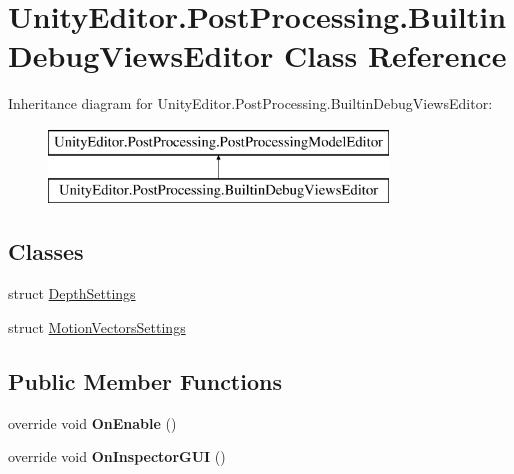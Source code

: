 \hypertarget{class_unity_editor_1_1_post_processing_1_1_builtin_debug_views_editor}{}\section{Unity\+Editor.\+Post\+Processing.\+Builtin\+Debug\+Views\+Editor Class Reference}
\label{class_unity_editor_1_1_post_processing_1_1_builtin_debug_views_editor}
Inheritance diagram for Unity\+Editor.\+Post\+Processing.\+Builtin\+Debug\+Views\+Editor\+:\begin{figure}[H]
\begin{center}
\leavevmode
\includegraphics[height=2.000000cm]{class_unity_editor_1_1_post_processing_1_1_builtin_debug_views_editor}
\end{center}
\end{figure}
\subsection*{Classes}
\begin{DoxyCompactItemize}
\item 
struct \hyperlink{struct_unity_editor_1_1_post_processing_1_1_builtin_debug_views_editor_1_1_depth_settings}{Depth\+Settings}
\item 
struct \hyperlink{struct_unity_editor_1_1_post_processing_1_1_builtin_debug_views_editor_1_1_motion_vectors_settings}{Motion\+Vectors\+Settings}
\end{DoxyCompactItemize}
\subsection*{Public Member Functions}
\begin{DoxyCompactItemize}
\item 
\mbox{\label{class_unity_editor_1_1_post_processing_1_1_builtin_debug_views_editor_a25ae9660ff2582094d46a5647ee1a5cf}} 
override void {\bfseries On\+Enable} ()
\item 
\mbox{\label{class_unity_editor_1_1_post_processing_1_1_builtin_debug_views_editor_a5707f6b766ba9c6ada9a266ecc69948b}} 
override void {\bfseries On\+Inspector\+G\+UI} ()
\end{DoxyCompactItemize}
